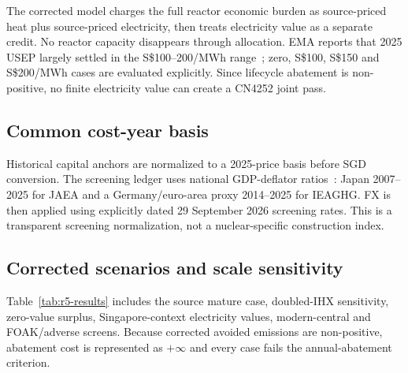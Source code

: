 The corrected model charges the full reactor economic burden as source-priced heat plus source-priced electricity, then treats electricity value as a separate credit. No reactor capacity disappears through allocation. EMA reports that 2025 USEP largely settled in the S\$100--200/MWh range~\cite{emausep2025}; zero, S\$100, S\$150 and S\$200/MWh cases are evaluated explicitly. Since lifecycle abatement is non-positive, no finite electricity value can create a CN4252 joint pass.

\begin{table}[htbp]\centering\scriptsize
\caption{Review-5-remediated cogeneration closure. An infinite CN4252 break-even electricity value means that electricity economics cannot repair non-positive lifecycle abatement.}
\label{tab:r5-cogen}
\end{table}

\subsection{Common cost-year basis}
Historical capital anchors are normalized to a 2025-price basis before SGD conversion. The screening ledger uses national GDP-deflator ratios~\cite{worldbankdeflator}: Japan 2007--2025 for JAEA and a Germany/euro-area proxy 2014--2025 for IEAGHG. FX is then applied using explicitly dated 29 September 2026 screening rates. This is a transparent screening normalization, not a nuclear-specific construction index.

\begin{table}[htbp]\centering\tiny
\caption{Machine-readable Review-5 cost-year and FX conversion ledger.}
\label{tab:r5-cost-ledger}
\end{table}

\subsection{Corrected scenarios and scale sensitivity}
Table~\ref{tab:r5-results} includes the source mature case, doubled-IHX sensitivity, zero-value surplus, Singapore-context electricity values, modern-central and FOAK/adverse screens. Because corrected avoided emissions are non-positive, abatement cost is represented as $+\infty$ and every case fails the annual-abatement criterion.

